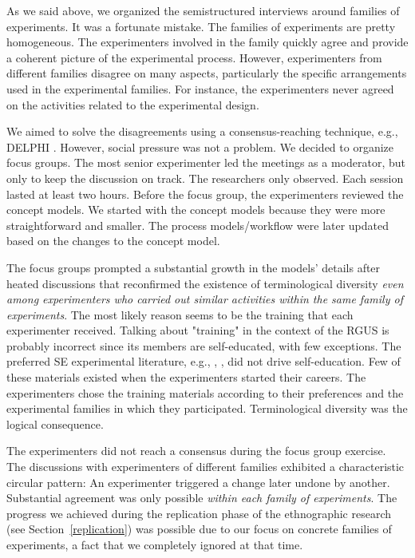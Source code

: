 As we said above, we organized the semistructured interviews around families of experiments. It was a fortunate mistake. The families of experiments are pretty homogeneous. The experimenters involved in the family quickly agree and provide a coherent picture of the experimental process. However, experimenters from different families disagree on many aspects, particularly the specific arrangements used in the experimental families. For instance, the experimenters never agreed on the activities related to the experimental design.

We aimed to solve the disagreements using a consensus-reaching technique, e.g., DELPHI \cite{Dalkey-1967-Delphi}. However, social pressure was not a problem. We decided to organize focus groups. The most senior experimenter led the meetings as a moderator, but only to keep the discussion on track. The researchers only observed. Each session lasted at least two hours. Before the focus group, the experimenters reviewed the concept models. We started with the concept models because they were more straightforward and smaller. The process models/workflow were later updated based on the changes to the concept model.

The focus groups prompted a substantial growth in the models' details after heated discussions that reconfirmed the existence of terminological diversity \textit{even among experimenters who carried out similar activities within the same family of experiments}. The most likely reason seems to be the training that each experimenter received. Talking about "training" in the context of the RGUS is probably incorrect since its members are self-educated, with few exceptions. The preferred SE experimental literature, e.g., \cite{Creswell-2009-Method-Approaches}, \cite{montgomery-2019-Design-Analysis-Experiments}, did not drive self-education. Few of these materials existed when the experimenters started their careers. The experimenters chose the training materials according to their preferences and the experimental families in which they participated. Terminological diversity was the logical consequence.

The experimenters did not reach a consensus during the focus group exercise. The discussions with experimenters of different families exhibited a characteristic circular pattern: An experimenter triggered a change later undone by another. Substantial agreement was only possible \textit{within each family of experiments}. The progress we achieved during the replication phase of the ethnographic research (see Section~\ref {replication}) was possible due to our focus on concrete families of experiments, a fact that we completely ignored at that time.

